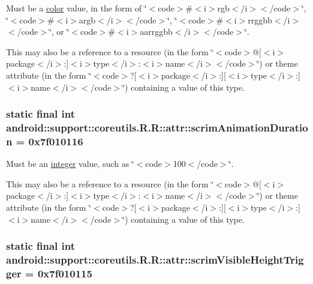 Must be a \hyperlink{classandroid_1_1support_1_1coreutils_1_1_r_1_1color}{color} value, in the form of \char`\"{}$<$code$>$\#$<$i$>$rgb$<$/i$>$$<$/code$>$\char`\"{}, \char`\"{}$<$code$>$\#$<$i$>$argb$<$/i$>$$<$/code$>$\char`\"{}, \char`\"{}$<$code$>$\#$<$i$>$rrggbb$<$/i$>$$<$/code$>$\char`\"{}, or \char`\"{}$<$code$>$\#$<$i$>$aarrggbb$<$/i$>$$<$/code$>$\char`\"{}. 

This may also be a reference to a resource (in the form \char`\"{}$<$code$>$@\mbox{[}$<$i$>$package$<$/i$>$:\mbox{]}$<$i$>$type$<$/i$>$:$<$i$>$name$<$/i$>$$<$/code$>$\char`\"{}) or theme attribute (in the form \char`\"{}$<$code$>$?\mbox{[}$<$i$>$package$<$/i$>$:\mbox{]}\mbox{[}$<$i$>$type$<$/i$>$:\mbox{]}$<$i$>$name$<$/i$>$$<$/code$>$\char`\"{}) containing a value of this type. \hypertarget{classandroid_1_1support_1_1coreutils_1_1_r_1_1attr_0420faa5eeecf90f33e1971eaa8b0127}{
\subsubsection[{scrimAnimationDuration}]{\setlength{\rightskip}{0pt plus 5cm}static final int android::support::coreutils.R.R::attr::scrimAnimationDuration = 0x7f010116}}
\label{classandroid_1_1support_1_1coreutils_1_1_r_1_1attr_0420faa5eeecf90f33e1971eaa8b0127}


Must be an \hyperlink{classandroid_1_1support_1_1coreutils_1_1_r_1_1integer}{integer} value, such as \char`\"{}$<$code$>$100$<$/code$>$\char`\"{}. 

This may also be a reference to a resource (in the form \char`\"{}$<$code$>$@\mbox{[}$<$i$>$package$<$/i$>$:\mbox{]}$<$i$>$type$<$/i$>$:$<$i$>$name$<$/i$>$$<$/code$>$\char`\"{}) or theme attribute (in the form \char`\"{}$<$code$>$?\mbox{[}$<$i$>$package$<$/i$>$:\mbox{]}\mbox{[}$<$i$>$type$<$/i$>$:\mbox{]}$<$i$>$name$<$/i$>$$<$/code$>$\char`\"{}) containing a value of this type. \hypertarget{classandroid_1_1support_1_1coreutils_1_1_r_1_1attr_9ce00b32088bba7791a6f01cddc64bb0}{
\subsubsection[{scrimVisibleHeightTrigger}]{\setlength{\rightskip}{0pt plus 5cm}static final int android::support::coreutils.R.R::attr::scrimVisibleHeightTrigger = 0x7f010115}}
\label{classandroid_1_1support_1_1coreutils_1_1_r_1_1attr_9ce00b32088bba7791a6f01cddc64bb0}


